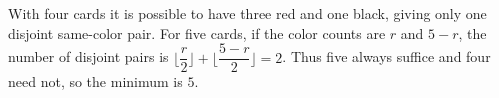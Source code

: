 With four cards it is possible to have three red and one black, giving only one disjoint same-color pair. For five cards, if the color counts are $r$ and $5-r$, the number of disjoint pairs is $\lfloor \dfrac{r}{2}\rfloor+\lfloor\dfrac{5-r}{2}\rfloor=2$. Thus five always suffice and four need not, so the minimum is $\boxed 5$.
